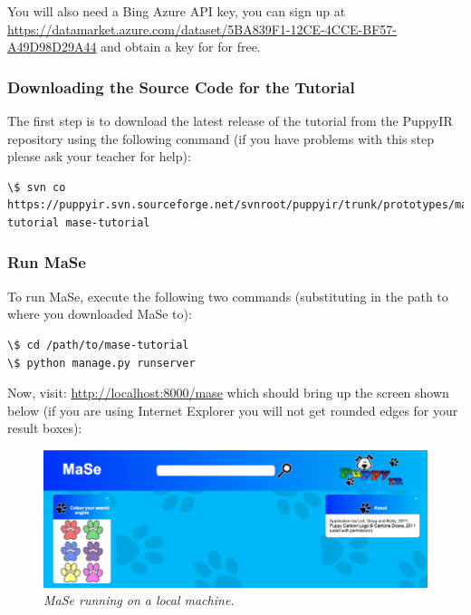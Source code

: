 \documentclass[letterpaper,10pt,english]{sphinxmanual}
\begin{document}
You will also need a Bing Azure API key, you can sign up at \href{https://datamarket.azure.com/dataset/5BA839F1-12CE-4CCE-BF57-A49D98D29A44}{https://datamarket.azure.com/dataset/5BA839F1-12CE-4CCE-BF57-A49D98D29A44} and obtain a key for for free.


\subsubsection{Downloading the Source Code for the Tutorial}
\label{mase-tutorial:downloading-the-source-code-for-the-tutorial}
The first step is to download the latest release of the tutorial from the PuppyIR repository using the following command (if you have problems with this step please ask your teacher for help):

\begin{Verbatim}[commandchars=\\\{\}]
\$ svn co https://puppyir.svn.sourceforge.net/svnroot/puppyir/trunk/prototypes/mase-tutorial mase-tutorial
\end{Verbatim}


\subsubsection{Run MaSe}
\label{mase-tutorial:run-mase}
To run MaSe, execute the following two commands (substituting in the path to where you downloaded MaSe to):

\begin{Verbatim}[commandchars=\\\{\}]
\$ cd /path/to/mase-tutorial
\$ python manage.py runserver
\end{Verbatim}

Now, visit: \href{http://localhost:8000/mase}{http://localhost:8000/mase} which should bring up the screen shown below (if you are using Internet Explorer you will not get rounded edges for your result boxes):
\begin{figure}[htbp]
\centering
\capstart

\includegraphics{mase-1-initial.png}
\caption{\emph{MaSe running on a local machine.}}\end{figure}
\end{document}
